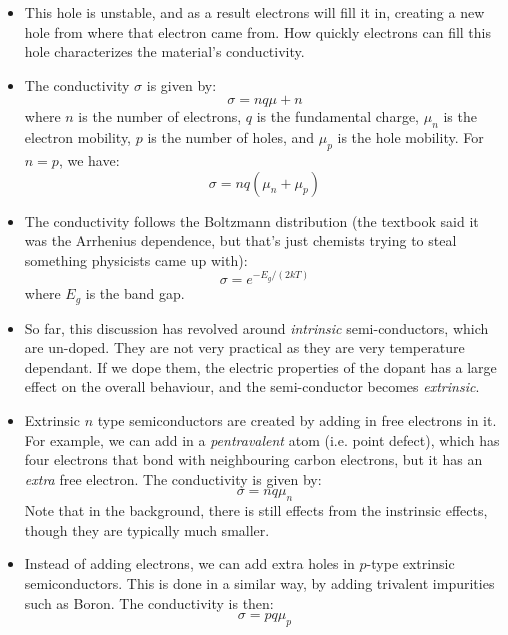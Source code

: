 \begin{itemize}
    \item This hole is unstable, and as a result electrons will fill it in, creating a new hole from where that electron came from. How quickly electrons can fill this hole characterizes the material's conductivity.
    \item The conductivity $\sigma$ is given by:
    \begin{equation}
        \sigma = nq\mu+n
    \end{equation}
    where $n$ is the number of electrons, $q$ is the fundamental charge, $\mu_n$ is the electron mobility, $p$ is the number of holes, and $\mu_p$ is the hole mobility. For $n=p$, we have:
    \begin{equation}
        \sigma = nq(\mu_n+\mu_p)
    \end{equation}
    \item The conductivity follows the Boltzmann distribution (the textbook said it was the Arrhenius dependence, but that's just chemists trying to steal something physicists came up with):
    \begin{equation}
        \sigma = e^{-E_g/(2kT)}
    \end{equation}
    where $E_g$ is the band gap.
    \item So far, this discussion has revolved around \textit{intrinsic} semi-conductors, which are un-doped. They are not very practical as they are very temperature dependant. If we dope them, the electric properties of the dopant has a large effect on the overall behaviour, and the semi-conductor becomes \textit{extrinsic}.
    \item Extrinsic $n$ type semiconductors are created by adding in free electrons in it. For example, we can add in a \textit{pentravalent} atom (i.e. point defect), which has four electrons that bond with neighbouring carbon electrons, but it has an \textit{extra} free electron. The conductivity is given by:
    \begin{equation}
        \sigma = nq\mu_n
    \end{equation}
    Note that in the background, there is still effects from the instrinsic effects, though they are typically much smaller.
    \item Instead of adding electrons, we can add extra holes in $p$-type extrinsic semiconductors. This is done in a similar way, by adding trivalent impurities such as Boron. The conductivity is then:
    \begin{equation}
        \sigma = pq\mu_p
    \end{equation}
\end{itemize}